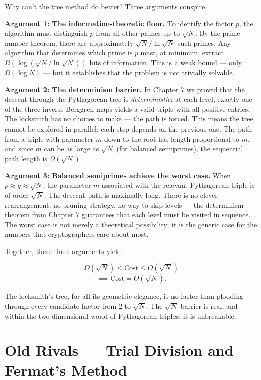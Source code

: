 \documentclass[11pt,twoside,openright]{book}
\theoremstyle{definition}
\theoremstyle{remark}
\begin{document}
Why can't the tree method do better? Three arguments conspire.

\textbf{Argument 1: The information-theoretic floor.} To identify the factor $p$, the algorithm must distinguish $p$ from all other primes up to $\sqrt{N}$. By the prime number theorem, there are approximately $\sqrt{N} / \ln \sqrt{N}$ such primes. Any algorithm that determines which prime is $p$ must, at minimum, extract $\Omega(\log(\sqrt{N} / \ln \sqrt{N}))$ bits of information. This is a weak bound --- only $\Omega(\log N)$ --- but it establishes that the problem is not trivially solvable.

\textbf{Argument 2: The determinism barrier.} In Chapter 7 we proved that the descent through the Pythagorean tree is \textit{deterministic}: at each level, exactly one of the three inverse Berggren maps yields a valid triple with all-positive entries. The locksmith has no choices to make --- the path is forced. This means the tree cannot be explored in parallel; each step depends on the previous one. The path from a triple with parameter $m$ down to the root has length proportional to $m$, and since $m$ can be as large as $\sqrt{N}$ (for balanced semiprimes), the sequential path length is $\Omega(\sqrt{N})$.

\textbf{Argument 3: Balanced semiprimes achieve the worst case.} When $p \approx q \approx \sqrt{N}$, the parameter $m$ associated with the relevant Pythagorean triple is of order $\sqrt{N}$. The descent path is maximally long. There is no clever rearrangement, no pruning strategy, no way to skip levels --- the determinism theorem from Chapter 7 guarantees that each level must be visited in sequence. The worst case is not merely a theoretical possibility; it is the generic case for the numbers that cryptographers care about most.

Together, these three arguments yield:

\[\Omega(\sqrt{N}) \le \text{Cost} \le O(\sqrt{N})\]
\[\implies \text{Cost} = \Theta(\sqrt{N}).\]

The locksmith's tree, for all its geometric elegance, is no faster than plodding through every candidate factor from $2$ to $\sqrt{N}$. The $\sqrt{N}$ barrier is real, and within the two-dimensional world of Pythagorean triples, it is unbreakable.



\section{Old Rivals --- Trial Division and Fermat's Method}
\end{document}
